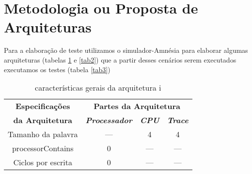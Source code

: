 \section{Metodologia ou Proposta de Arquiteturas}

    Para a elaboração de teste utilizamos o simulador-Amnésia para elaborar algumas
    arquiteturas (tabelas \ref{tab1} e \ref{tab2}) que a partir desses cenários serem executados
    executamos os testes (tabela \ref{tab3})
    \begin{table}[H]
    \caption{características gerais da arquitetura i}
        \centering
        \begin{tabular}{|c|c|c|c|}
            \hline
            \textbf{Especificações} & \multicolumn{3}{|c|}{\textbf{Partes da Arquitetura}} \\
            \cline{2-4} 
            \textbf{da Arquitetura} & \textbf{\textit{Processador}}& \textbf{\textit{CPU}}& \textbf{\textit{Trace}} \\
            \hline
            Tamanho da palavra & --- & 4 & 4 \\
            \hline
            processorContains & 0 & --- & --- \\
            \hline
            Ciclos por escrita & 0 & --- & --- \\
            \hline
        \end{tabular}
        \label{tab1}
    \end{table}


